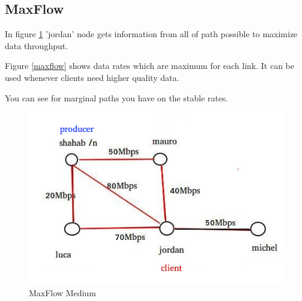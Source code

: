 \subsection{MaxFlow}
In figure \ref{MaxFlow} 'jordan' node gets information from all of path possible to maximize data throughput.

Figure \ref{maxflow} shows data rates which are maximum for each link. It can be used whenever clients need higher quality data.

You can see for marginal paths you have on the stable rates.
\begin{figure}[H]

\begin{center}

\includegraphics[scale = 0.4]{Figures/MaxFlow.png}

\caption{MaxFlow Medium} \label{MaxFlow} 


\end{center}

\end{figure}

